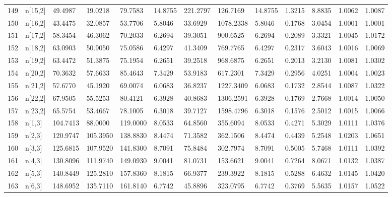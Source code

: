 \begin{table}[ht]
\begin{tabular}{rllllllllllll}
  149 & n[15,2] &  49.4987 &   19.0218 &  79.7583 &  14.8755 &   221.2797 &  126.7169 &  14.8755 &  1.3215 &  8.8835 & 1.0062 &  1.0087 \\ 
  150 & n[16,2] &  43.4475 &   32.0857 &  53.7706 &   5.8046 &    33.6929 & 1078.2338 &   5.8046 &  0.1768 &  3.0454 & 1.0001 &  1.0001 \\ 
  151 & n[17,2] &  58.3454 &   46.3062 &  70.2033 &   6.2694 &    39.3051 &  900.6525 &   6.2694 &  0.2089 &  3.3321 & 1.0045 &  1.0172 \\ 
  152 & n[18,2] &  63.0903 &   50.9050 &  75.0586 &   6.4297 &    41.3409 &  769.7765 &   6.4297 &  0.2317 &  3.6043 & 1.0016 &  1.0069 \\ 
  153 & n[19,2] &  63.4472 &   51.3875 &  75.1954 &   6.2651 &    39.2518 &  968.6875 &   6.2651 &  0.2013 &  3.2130 & 1.0081 &  1.0302 \\ 
  154 & n[20,2] &  70.3632 &   57.6633 &  85.4643 &   7.3429 &    53.9183 &  617.2301 &   7.3429 &  0.2956 &  4.0251 & 1.0004 &  1.0023 \\ 
  155 & n[21,2] &  57.6770 &   45.1920 &  69.0074 &   6.0683 &    36.8237 & 1227.3409 &   6.0683 &  0.1732 &  2.8544 & 1.0087 &  1.0322 \\ 
  156 & n[22,2] &  67.9505 &   55.5253 &  80.4121 &   6.3928 &    40.8683 & 1306.2591 &   6.3928 &  0.1769 &  2.7668 & 1.0014 &  1.0050 \\ 
  157 & n[23,2] &  65.5754 &   53.4667 &  78.1005 &   6.3018 &    39.7127 & 1598.4796 &   6.3018 &  0.1576 &  2.5012 & 1.0015 &  1.0066 \\ 
  158 & n[1,3] & 104.7413 &   88.0000 & 119.0000 &   8.0533 &    64.8560 &  355.6094 &   8.0533 &  0.4271 &  5.3029 & 1.0111 &  1.0376 \\ 
  159 & n[2,3] & 120.9747 &  105.3950 & 138.8830 &   8.4474 &    71.3582 &  362.1506 &   8.4474 &  0.4439 &  5.2548 & 1.0203 &  1.0651 \\ 
  160 & n[3,3] & 125.6815 &  107.9520 & 141.8300 &   8.7091 &    75.8484 &  302.7974 &   8.7091 &  0.5005 &  5.7468 & 1.0111 &  1.0392 \\ 
  161 & n[4,3] & 130.8096 &  111.9740 & 149.0930 &   9.0041 &    81.0731 &  153.6621 &   9.0041 &  0.7264 &  8.0671 & 1.0132 &  1.0387 \\ 
  162 & n[5,3] & 140.8449 &  125.2810 & 157.8360 &   8.1815 &    66.9377 &  239.3922 &   8.1815 &  0.5288 &  6.4632 & 1.0145 &  1.0420 \\ 
  163 & n[6,3] & 148.6952 &  135.7110 & 161.8140 &   6.7742 &    45.8896 &  323.0795 &   6.7742 &  0.3769 &  5.5635 & 1.0157 &  1.0522 \\ 

\end{tabular}
\end{table}
